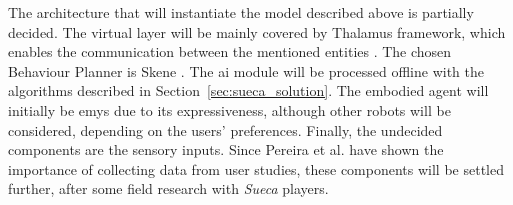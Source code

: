 The architecture that will instantiate the model described above is partially decided.
The virtual layer will be mainly covered by Thalamus framework, which enables the communication between the mentioned entities \cite{Ribeiro}.
The chosen Behaviour Planner is Skene \cite{Ribeiroa}.
The \ac{ai} module will be processed offline with the algorithms described in Section~\ref{sec:sueca_solution}.
The embodied agent will initially be \ac{emys} due to its expressiveness, although other robots will be considered, depending on the users' preferences.
Finally, the undecided components are the sensory inputs.
Since Pereira et al. have shown the importance of collecting data from user studies, these components will be settled further, after some field research with \emph{Sueca} players.
